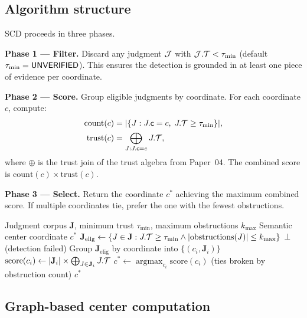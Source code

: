 \documentclass[11pt]{article}
\newcommand{\SCD}{\textsc{SCD}}             %
\begin{document}
\subsection{Algorithm structure}

\SCD{} proceeds in three phases.

\medskip
\noindent\textbf{Phase 1 — Filter.}  Discard any judgment $\mathcal{J}$ with
$\mathcal{J}.\mathcal{T} < \tau_{\min}$ (default $\tau_{\min} = \mathsf{UNVERIFIED}$).  This
ensures the detection is grounded in at least one piece of evidence per
coordinate.

\medskip
\noindent\textbf{Phase 2 — Score.}  Group eligible judgments by coordinate.
For each coordinate $c$, compute:
\begin{align*}
  \mathrm{count}(c)  &= |\{J : J.\mathsf{c} = c,\; J.\mathcal{T} \geq \tau_{\min}\}|, \\
  \mathrm{trust}(c)  &= \bigoplus_{J : J.\mathsf{c} = c} J.\mathcal{T},
\end{align*}
where $\oplus$ is the trust join of the trust algebra from Paper~04.
The combined score is $\mathrm{count}(c) \times \mathrm{trust}(c)$.

\medskip
\noindent\textbf{Phase 3 — Select.}  Return the coordinate $c^*$
achieving the maximum combined score.  If multiple coordinates tie,
prefer the one with the fewest obstructions.

\begin{algorithm}[h]
\caption{\SCD{}: Semantic Center Detection}
\label{alg:scd}
\begin{algorithmic}[1]
\Require Judgment corpus $\mathbf{J}$, minimum trust $\tau_{\min}$,
         maximum obstructions $k_{\max}$
\Ensure Semantic center coordinate $c^*$
\State $\mathbf{J}_{\mathrm{elig}} \gets
       \{J \in \mathbf{J} : J.\mathcal{T} \geq \tau_{\min} \wedge
         |\mathrm{obstructions}(J)| \leq k_{\max}\}$
  \Return $\bot$ (detection failed)
\EndIf
\State Group $\mathbf{J}_{\mathrm{elig}}$ by coordinate into
       $\{(c_i, \mathbf{J}_i)\}$
  \State $\mathrm{score}(c_i) \gets |\mathbf{J}_i| \times
         \bigoplus_{J \in \mathbf{J}_i} J.\mathcal{T}$
\EndFor
\State $c^* \gets \operatorname{argmax}_{c_i} \mathrm{score}(c_i)$
       (ties broken by obstruction count)
\Return $c^*$
\end{algorithmic}
\end{algorithm}

\subsection{Graph-based center computation}\label{sec:graph-center}
\end{document}
